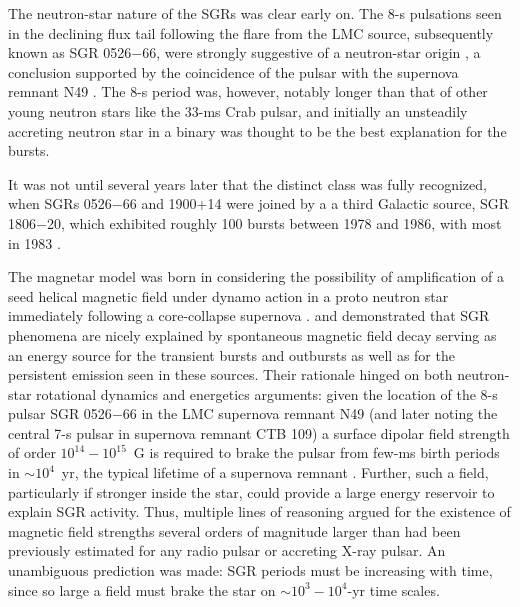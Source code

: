 \documentclass[letterpaper]{ar-1col}
\begin{document}
The neutron-star nature of the SGRs was clear early on.
The 8-s pulsations seen in the
declining flux tail following the flare from the LMC source, subsequently
known as SGR 0526$-$66, were 
strongly suggestive of a neutron-star origin \citep{mgi+79}, a conclusion supported by
the coincidence of the pulsar with the supernova remnant N49 \citep{cdt+82}.
The 8-s period was, however, notably longer than that of other young neutron
stars like the 33-ms Crab pulsar, and initially an unsteadily accreting neutron star in a binary
was thought to be the best explanation for the bursts. 

It was not until several years later that the distinct class was fully recognized,
when SGRs 0526$-$66 and 1900+14 were joined by a
a third Galactic source, SGR 1806$-$20, which exhibited roughly 100 bursts between 1978 and 1986, with
most in 1983 \citep{lfk+87,knc+87}. 


The magnetar model was born in considering
the possibility of amplification of a seed helical magnetic field under dynamo action
in a proto neutron star immediately following a core-collapse supernova \citep{dt92a}.
\citet{td95} and \citet{td96a} demonstrated that SGR phenomena are nicely
explained by spontaneous magnetic field decay
serving as an energy source for the transient bursts and outbursts as well as
for the persistent emission seen in these sources. 
Their rationale hinged on both neutron-star rotational dynamics and energetics
arguments:  given the location of the 8-s pulsar SGR 0526$-$66 in the LMC supernova remnant
N49 (and later noting the
central 7-s pulsar in supernova remnant CTB 109)
a surface dipolar field strength of order $10^{14}-10^{15}$~G is required to brake
the pulsar from few-ms birth periods in $\sim 10^4$~yr, the typical lifetime of a
supernova remnant \citep[see also][]{pac92}.  
Further, such a field, particularly if stronger inside the star, could
provide a large energy reservoir to explain SGR activity.
Thus, multiple
lines of reasoning argued for the existence of magnetic field strengths several orders
of magnitude larger than had been previously estimated for any radio pulsar or accreting
X-ray pulsar.  An unambiguous prediction was made:  SGR periods must be increasing with time,
since so large a field must brake the star on $\sim 10^3 - 10^4$-yr time scales.
\end{document}
